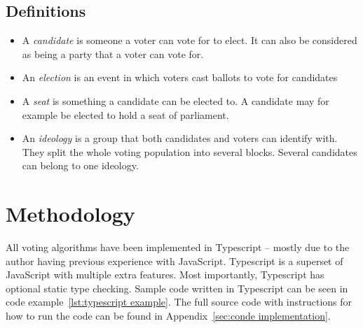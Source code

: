 \documentclass[12pt]{article}
\begin{document}
\subsection{Definitions}
\begin{itemize}
	\item A \textit{candidate} is someone a voter can vote for to elect. It can also be considered as being a party that a voter can vote for.
	\item An \textit{election} is an event in which voters cast ballots to vote for candidates
	\item A \textit{seat} is something a candidate can be elected to. A candidate may for example be elected to hold a seat of parliament.
	\item An \textit{ideology} is a group that both candidates and voters can identify with. They split the whole voting population into several blocks. Several candidates can belong to one ideology.
\end{itemize}  
\pagebreak
\section{Methodology}
All voting algorithms have been implemented in Typescript – mostly due to the author having previous experience with JavaScript. Typescript is a superset of JavaScript with multiple extra features. Most importantly, Typescript has optional static type checking. Sample code written in Typescript can be seen in code example~\ref{lst:typescript example}. The full source code with instructions for how to run the code can be found in Appendix~\ref{sec:conde implementation}.
\end{document}
